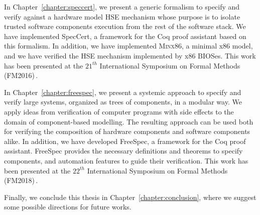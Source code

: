 In Chapter~\ref{chapter:speccert}, we present a generic formalism to specify and
verify against a hardware model HSE mechanism whose purpose is to isolate
trusted software components execution from the rest of the software
stack. 
%
We have implemented SpecCert, a framework for the Coq proof assistant based on
this formalism. In addition, we have implemented {\scshape Minx86}, a minimal
x86 model, and we have verified the HSE mechanism implemented by x86
BIOSes.
%
This work has been presented at the $21^{th}$ International Symposium on Formal
Methods (FM2016)\,\cite{letan2016speccert}.

In Chapter~\ref{chapter:freespec}, we present a systemic approach to specify and
verify large systems, organized as trees of components, in a modular way.
%
We apply ideas from verification of computer programs with side effects to the
domain of component-based modelling. The resulting approach can be used both for
verifying the composition of hardware components and software components alike.
%
In addition, we have developed FreeSpec, a framework for the Coq proof
assistant.
%
FreeSpec provides the necessary definitions and theorems to specify components,
and automation features to guide their verification.
%
This work has been presented at the $22^{th}$ International Symposium on Formal
Methods (FM2018)\,\cite{letan2018freespec}.

Finally, we conclude this thesis in Chapter~\ref{chapter:conclusion}, where we
suggest some possible directions for future works.
